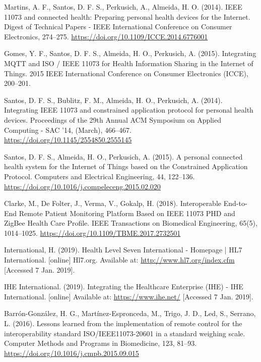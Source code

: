 \documentclass[conference]{IEEEtran}
\begin{document}
\begin{thebibliography}{00}
Martins, A. F., Santos, D. F. S., Perkusich, A., Almeida, H. O. (2014). IEEE 11073 and connected health: Preparing personal health devices for the Internet. Digest of Technical Papers - IEEE International Conference on Consumer Electronics, 274–275. \url{https://doi.org/10.1109/ICCE.2014.6776001}

 Gomes, Y. F., Santos, D. F. S., Almeida, H. O., Perkusich, A. (2015). Integrating MQTT and ISO / IEEE 11073 for Health Information Sharing in the Internet of Things. 2015 IEEE International Conference on Consumer Electronics (ICCE), 200–201.

 Santos, D. F. S., Bublitz, F. M., Almeida, H. O., Perkusich, A. (2014). Integrating IEEE 11073 and constrained application protocol for personal health devices. Proceedings of the 29th Annual ACM Symposium on Applied Computing - SAC ’14, (March), 466–467. \url{https://doi.org/10.1145/2554850.2555145}

 Santos, D. F. S., Almeida, H. O., Perkusich, A. (2015). A personal connected health system for the Internet of Things based on the Constrained Application Protocol. Computers and Electrical Engineering, 44, 122–136. \url{https://doi.org/10.1016/j.compeleceng.2015.02.020}

 Clarke, M., De Folter, J., Verma, V., Gokalp, H. (2018). Interoperable End-to-End Remote Patient Monitoring Platform Based on IEEE 11073 PHD and ZigBee Health Care Profile. IEEE Transactions on Biomedical Engineering, 65(5), 1014–1025. \url{https://doi.org/10.1109/TBME.2017.2732501}

 International, H. (2019). Health Level Seven International - Homepage | HL7 International. [online] Hl7.org. Available at: \url{http://www.hl7.org/index.cfm} [Accessed 7 Jan. 2019].

 IHE International. (2019). Integrating the Healthcare Enterprise (IHE) - IHE International. [online] Available at: \url{https://www.ihe.net/} [Accessed 7 Jan. 2019].

 Barrón-González, H. G., Martínez-Espronceda, M., Trigo, J. D., Led, S., Serrano, L. (2016). Lessons learned from the implementation of remote control for the interoperability standard ISO/IEEE11073-20601 in a standard weighing scale. Computer Methods and Programs in Biomedicine, 123, 81–93. \url{https://doi.org/10.1016/j.cmpb.2015.09.015}


\end{thebibliography}
\end{document}
